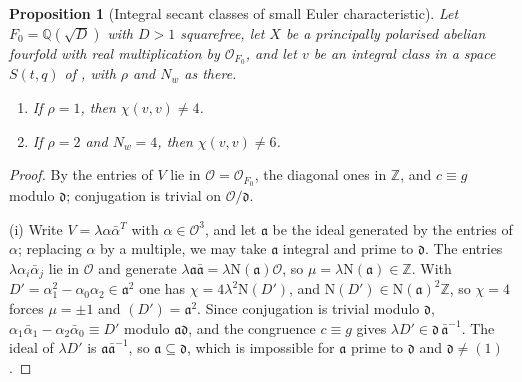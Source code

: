 \documentclass[11pt,reqno]{amsart}
\theoremstyle{plain}
\newtheorem{proposition}[theorem]{Proposition}
\theoremstyle{definition}
\theoremstyle{remark}
\newcommand{\QQ}{\mathbb{Q}}
\newcommand{\ZZ}{\mathbb{Z}}
\newcommand{\cO}{\mathcal{O}}
\newcommand{\Nm}{\mathrm{N}}             %
\begin{document}
\begin{proposition}[Integral secant classes of small Euler characteristic]
\label{prop:quarticother}
Let $F_{0}=\QQ(\sqrt D)$ with $D>1$ squarefree, let $X$ be a principally
polarised abelian fourfold with real multiplication by $\cO_{F_{0}}$, and let
$v$ be an integral class in a space $S(t,q)$ of ,
with $\rho$ and $N_{w}$ as there.
\begin{enumerate}[label=\textup{(\roman*)},leftmargin=2.6em,itemsep=2pt]
\item If $\rho=1$, then $\chi(v,v)\ne4$.
\item If $\rho=2$ and $N_{w}=4$, then $\chi(v,v)\ne6$.
\end{enumerate}
\end{proposition}

\begin{proof}
By  the entries of $V$ lie in $\cO=\cO_{F_{0}}$, the
diagonal ones in $\ZZ$, and $c\equiv g$ modulo $\mathfrak d$; conjugation is
trivial on $\cO/\mathfrak d$.

(i) Write $V=\lambda\alpha\bar\alpha^{T}$ with $\alpha\in\cO^{3}$, and let
$\mathfrak a$ be the ideal generated by the entries of $\alpha$; replacing
$\alpha$ by a multiple, we may take $\mathfrak a$ integral and prime to
$\mathfrak d$. The entries $\lambda\alpha_{i}\bar\alpha_{j}$ lie in $\cO$ and
generate $\lambda\mathfrak a\bar{\mathfrak a}=\lambda\Nm(\mathfrak a)\cO$, so
$\mu=\lambda\Nm(\mathfrak a)\in\ZZ$. With $D'=\alpha_{1}^{2}-\alpha_{0}\alpha_{2}
\in\mathfrak a^{2}$ one has $\chi=4\lambda^{2}\Nm(D')$, and
$\Nm(D')\in\Nm(\mathfrak a)^{2}\ZZ$, so $\chi=4$ forces $\mu=\pm1$ and
$(D')=\mathfrak a^{2}$. Since conjugation is trivial modulo $\mathfrak d$,
$\alpha_{1}\bar\alpha_{1}-\alpha_{2}\bar\alpha_{0}\equiv D'$ modulo
$\mathfrak a\mathfrak d$, and the congruence $c\equiv g$ gives
$\lambda D'\in\mathfrak d\,\bar{\mathfrak a}^{-1}$. The ideal of $\lambda D'$ is
$\mathfrak a\bar{\mathfrak a}^{-1}$, so $\mathfrak a\subseteq\mathfrak d$, which
is impossible for $\mathfrak a$ prime to $\mathfrak d$ and $\mathfrak d\ne(1)$.


\end{proof}
\end{document}
